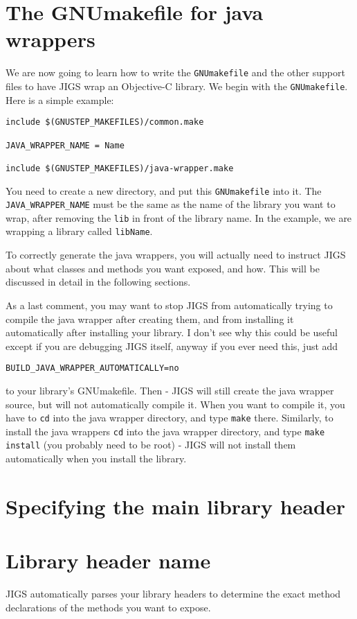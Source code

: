 \section{The GNUmakefile for java wrappers}
We are now going to learn how to write the \texttt{GNUmakefile} and
the other support files to have JIGS wrap an Objective-C library.  We
begin with the \texttt{GNUmakefile}.  Here is a simple example:

\begin{verbatim}
include $(GNUSTEP_MAKEFILES)/common.make

JAVA_WRAPPER_NAME = Name

include $(GNUSTEP_MAKEFILES)/java-wrapper.make
\end{verbatim}

You need to create a new directory, and put this \texttt{GNUmakefile}
into it.  The \texttt{JAVA\_WRAPPER\_NAME} must be the same as the name
of the library you want to wrap, after removing the \texttt{lib} in
front of the library name.  In the example, we are wrapping a library
called \texttt{libName}.

To correctly generate the java wrappers, you will actually need to
instruct JIGS about what classes and methods you want exposed, and
how.  This will be discussed in detail in the following sections.

As a last comment, you may want to stop JIGS from automatically trying
to compile the java wrapper after creating them, and from installing
it automatically after installing your library.  I don't see why this
could be useful except if you are debugging JIGS itself, anyway if you
ever need this, just add
\begin{verbatim}
BUILD_JAVA_WRAPPER_AUTOMATICALLY=no
\end{verbatim}
to your library's GNUmakefile.  Then - JIGS will still create the java
wrapper source, but will not automatically compile it.  When you want
to compile it, you have to \texttt{cd} into the java wrapper
directory, and type \texttt{make} there.  Similarly, to install the
java wrappers \texttt{cd} into the java wrapper directory, and type
\texttt{make install} (you probably need to be root) - JIGS will not
install them automatically when you install the library.

\section{Specifying the main library header}

\section{Library header name}
JIGS automatically parses your library headers to determine the exact
method declarations of the methods you want to expose.

